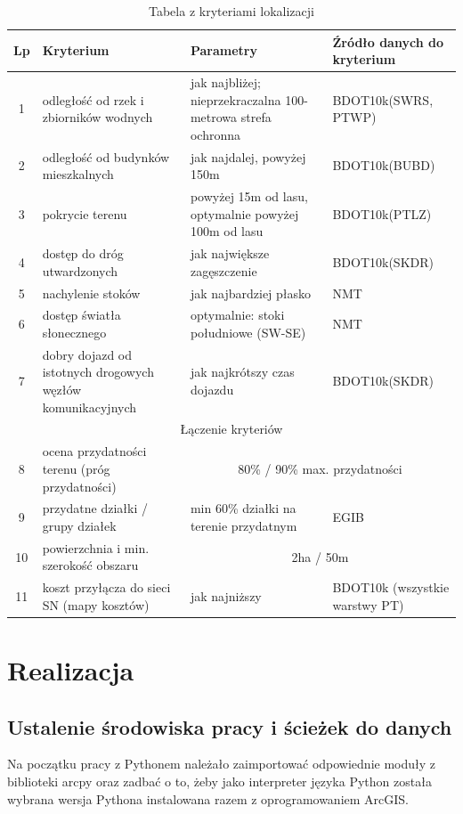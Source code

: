\documentclass{article}
\begin{document}
\begin{table}[h!]
    \centering
    \renewcommand{\arraystretch}{1.4}
    \begin{tabular}{|c|p{4cm}|p{5cm}|p{3.5cm}|}
    \hline
    \textbf{Lp} & \textbf{Kryterium} & \textbf{Parametry} & \textbf{Źródło danych do kryterium} \\ \hline
    1 & odległość od rzek i zbiorników wodnych & jak najbliżej; nieprzekraczalna 100-metrowa strefa ochronna & BDOT10k(SWRS, PTWP)\\ \hline
    2 & odległość od budynków mieszkalnych & jak najdalej, powyżej 150m & BDOT10k(BUBD)\\ \hline
    3 & pokrycie terenu & powyżej 15m od lasu, optymalnie powyżej 100m od lasu & BDOT10k(PTLZ)\\ \hline
    4 & dostęp do dróg utwardzonych & jak największe zagęszczenie & BDOT10k(SKDR)\\ \hline
    5 & nachylenie stoków & jak najbardziej płasko & NMT\\ \hline
    6 & dostęp światła słonecznego & optymalnie: stoki południowe (SW-SE) & NMT\\ \hline
    7 & dobry dojazd od istotnych drogowych węzłów komunikacyjnych & jak najkrótszy czas dojazdu & BDOT10k(SKDR)\\ \hline
    \multicolumn{4}{|c|}{Łączenie kryteriów} \\ \hline
    8 & ocena przydatności terenu (próg przydatności) & \multicolumn{2}{|c|}{80\% / 90\% max. przydatności}\\ \hline
    9 & przydatne działki / grupy działek & min 60\% działki na terenie przydatnym & EGIB \\ \hline
    10 & powierzchnia i min. szerokość obszaru & \multicolumn{2}{|c|}{2ha / 50m}\\ \hline
    11 & koszt przyłącza do sieci SN (mapy kosztów) & jak najniższy & BDOT10k (wszystkie warstwy PT)\\ \hline
    \end{tabular}
    \caption{Tabela z kryteriami lokalizacji}
    \label{tab:kryteria}
    \end{table}
\newpage

\section{Realizacja}
\subsection{Ustalenie środowiska pracy i ścieżek do danych}
Na początku pracy z Pythonem należało zaimportować odpowiednie moduły z biblioteki arcpy oraz zadbać o to, żeby jako interpreter języka Python została wybrana wersja Pythona instalowana razem z oprogramowaniem ArcGIS.
\vspace{5pt}
\end{document}
